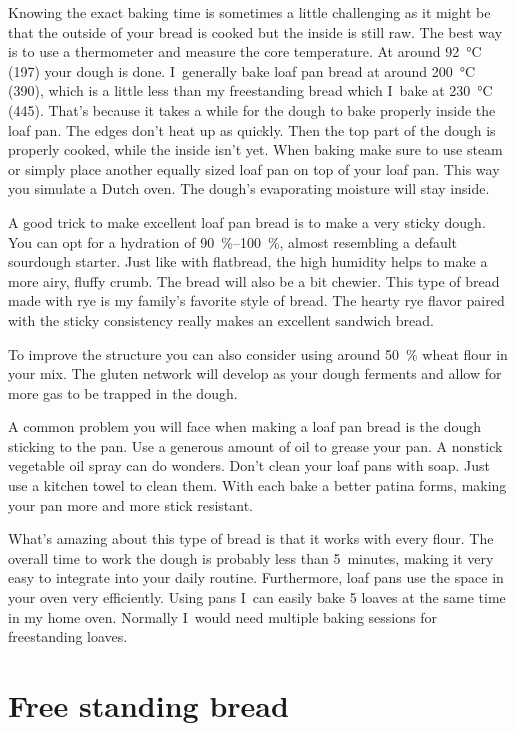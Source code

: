 Knowing the exact baking time is sometimes a little challenging
as it might be that the outside of your bread is cooked but
the inside is still raw. The best way is to use a thermometer
and measure the core temperature. At around  \qty{92}{\degreeCelsius}
(\qty{197}{\degF}) your dough is done. I~generally bake loaf pan bread at
around  \qty{200}{\degreeCelsius} (\qty{390}{\degF}), which is a little less
than my freestanding bread which I~bake at  \qty{230}{\degreeCelsius}
(\qty{445}{\degF}). That's because it takes a while for the dough
to bake properly inside the loaf pan. The edges don't heat up
as quickly. Then the top part of the dough is properly cooked, while
the inside isn't yet. When baking make sure to use steam
or simply place another equally sized loaf pan on top
of your loaf pan. This way you simulate a Dutch oven. The dough's
evaporating moisture will stay inside.

A good trick to make excellent loaf pan bread is to make a very
sticky dough. You can opt for a hydration of \qtyrange{90}{100}{\percent}, almost
resembling a default sourdough starter. Just like with flatbread,
the high humidity helps to make a more airy, fluffy crumb. The bread will
also be a bit chewier. This type of bread made with rye is my family's favorite
style of bread.  The hearty rye flavor paired with the sticky consistency really
makes an excellent sandwich bread.

To improve the structure you can also consider using around \qty{50}{\percent}
wheat flour in your mix. The gluten network will develop as your
dough ferments and allow for more gas to be trapped in the dough.

A common problem you will face when making a loaf pan bread is
the dough sticking to the pan. Use a generous amount of oil to grease
your pan. A nonstick vegetable oil spray can do wonders.
Don't clean your loaf pans with soap. Just use a kitchen towel
to clean them. With each bake a better patina forms, making your
pan more and more stick resistant.

What's amazing about this type of bread is that it works
with every flour. The overall time to work the dough is probably
less than 5~minutes, making it very easy to integrate
into your daily routine. Furthermore, loaf pans use the space
in your oven very efficiently. Using pans I~can
easily bake 5 loaves at the same time in my home oven.
Normally I~would need multiple baking sessions for
freestanding loaves.

\section{Free standing bread}

